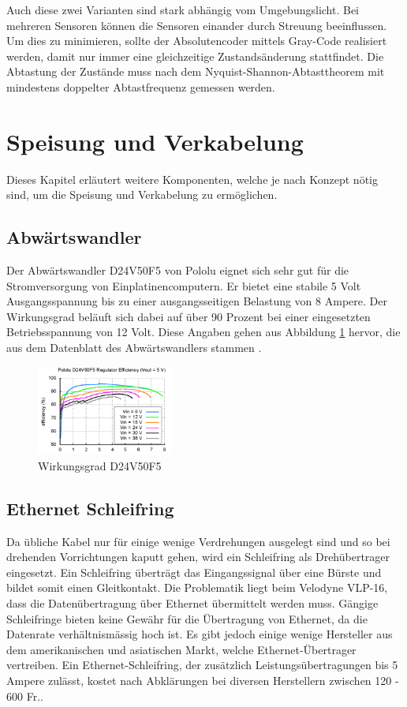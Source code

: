 Auch diese zwei Varianten sind stark abhängig vom Umgebungslicht. Bei mehreren Sensoren können die Sensoren einander durch Streuung beeinflussen. Um dies zu minimieren, sollte der Absolutencoder mittels Gray-Code realisiert werden, damit nur immer eine gleichzeitige Zustandsänderung stattfindet. Die Abtastung der Zustände muss nach dem Nyquist-Shannon-Abtasttheorem mit mindestens doppelter Abtastfrequenz gemessen werden.
 
\section{Speisung und Verkabelung}
\label{sec:Speisung und Verkabelung}
Dieses Kapitel erläutert weitere Komponenten, welche je nach Konzept nötig sind, um  die Speisung und Verkabelung zu ermöglichen.

\subsection{Abwärtswandler}
\label{subsec:Abwaertswandler}
Der Abwärtswandler D24V50F5 von Pololu eignet sich sehr gut für die Stromversorgung von Einplatinencomputern. Er bietet eine stabile 5 Volt Ausgangsspannung bis zu einer ausgangsseitigen Belastung von 8 Ampere. Der Wirkungsgrad beläuft sich dabei auf über 90 Prozent bei einer eingesetzten Betriebsspannung von 12 Volt. Diese Angaben gehen aus Abbildung \ref{fig:D24V50F5} hervor, die aus dem Datenblatt des Abwärtswandlers stammen \cite{D24V50F5}.
\begin{figure}[H]
	\centering
	\includegraphics[width=0.4\textwidth]
	{resources/D24V50F5.PNG}
	\caption[Wirkungsgrad D24V50F5]{Wirkungsgrad D24V50F5 \protect\cite{D24V50F5}}
	\label{fig:D24V50F5}
\end{figure}

\subsection{Ethernet Schleifring}
\label{subsec:Schleifring}
Da übliche Kabel nur für einige wenige Verdrehungen ausgelegt sind und so bei drehenden Vorrichtungen kaputt gehen, wird ein Schleifring als Drehübertrager eingesetzt. Ein Schleifring überträgt das Eingangssignal über eine Bürste und bildet somit einen Gleitkontakt. Die Problematik liegt beim Velodyne VLP-16, dass die Datenübertragung über Ethernet übermittelt werden muss. Gängige Schleifringe bieten keine Gewähr für die Übertragung von Ethernet, da die Datenrate verhältnismässig hoch ist. Es gibt jedoch einige wenige Hersteller aus dem amerikanischen und asiatischen Markt, welche Ethernet-Übertrager vertreiben. Ein Ethernet-Schleifring, der zusätzlich Leistungsübertragungen bis 5 Ampere zulässt, kostet nach Abklärungen bei diversen Herstellern zwischen 120 - 600 Fr..


